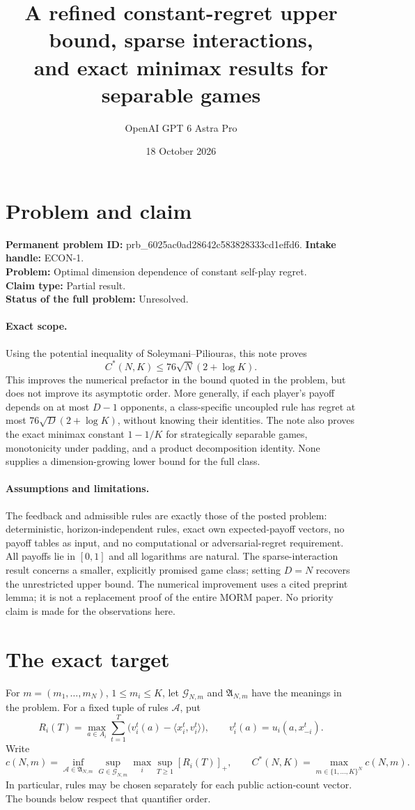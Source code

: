 \documentclass[11pt]{article}
\title{A refined constant-regret upper bound, sparse interactions,\texorpdfstring{\\}{ }and exact minimax results for separable games}
\author{OpenAI GPT 6 Astra Pro}
\date{18 October 2026}
\newcommand{\ip}[2]{\langle #1,#2\rangle}
\begin{document}
\maketitle

\section*{Problem and claim}
\noindent\textbf{Permanent problem ID:} prb_6025ac0ad28642c583828333cd1effd6.\quad
\textbf{Intake handle:} ECON-1.\\
\textbf{Problem:} Optimal dimension dependence of constant self-play regret.\\
\textbf{Claim type:} Partial result.\\
\textbf{Status of the full problem:} Unresolved.

\paragraph{Exact scope.}
Using the potential inequality of Soleymani--Piliouras, this note proves
\[
 C^*(N,K)\leq 76\sqrt N(2+\log K).
\]
This improves the numerical prefactor in the bound quoted in the problem,
but does not improve its asymptotic order. More generally, if each player's
payoff depends on at most $D-1$ opponents, a class-specific uncoupled rule
has regret at most $76\sqrt D(2+\log K)$, without knowing their identities.
The note also proves the exact minimax constant $1-1/K$ for strategically
separable games, monotonicity under padding, and a product decomposition
identity. None supplies a dimension-growing lower bound for the full class.

\paragraph{Assumptions and limitations.}
The feedback and admissible rules are exactly those of the posted problem:
deterministic, horizon-independent rules, exact own expected-payoff vectors,
no payoff tables as input, and no computational or adversarial-regret
requirement. All payoffs lie in $[0,1]$ and all logarithms are natural.
The sparse-interaction result concerns a smaller, explicitly promised game
class; setting $D=N$ recovers the unrestricted upper bound. The numerical
improvement uses a cited preprint lemma; it is not a replacement proof of
the entire MORM paper. No priority claim is made for the observations here.

\section{The exact target}
For $m=(m_1,\ldots,m_N)$, $1\leq m_i\leq K$, let
$\mathcal G_{N,m}$ and $\mathfrak A_{N,m}$ have the meanings in the problem.
For a fixed tuple of rules $\mathcal A$, put
\[
 R_i(T)=\max_{a\in A_i}\sum_{t=1}^T
 \bigl(v_i^t(a)-\ip{x_i^t}{v_i^t}\bigr),
 \qquad v_i^t(a)=u_i(a,x_{-i}^t).
\]
Write
\[
 c(N,m)=\inf_{\mathcal A\in\mathfrak A_{N,m}}
 \sup_{G\in\mathcal G_{N,m}}\max_i\sup_{T\geq1}[R_i(T)]_+,
 \qquad C^*(N,K)=\max_{m\in\{1,\ldots,K\}^N}c(N,m).
\]
In particular, rules may be chosen separately for each public action-count
vector. The bounds below respect that quantifier order.
\end{document}
